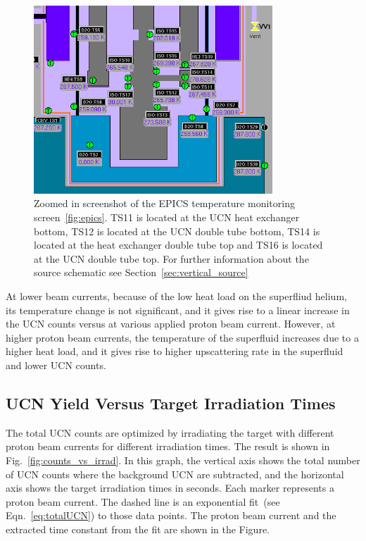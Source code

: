 \begin{figure}[h!]
  \centering
  \includegraphics[width=0.8\textwidth]{TSs.png}
  \caption[TUCAN's EPICS temperature monitoring screen~(zoomed
  in)]{Zoomed in screenshot of the EPICS temperature monitoring
    screen~\ref{fig:epics}. TS11 is located at the UCN heat exchanger
    bottom, TS12 is located at the UCN double tube bottom, TS14 is
    located at the heat exchanger double tube top and TS16 is located
    at the UCN double tube top. For further information about the
    source schematic see Section~\ref{sec:vertical_source}}
  \label{fig:TSs}
\end{figure}

At lower beam currents, because of the low heat load on the superfliud
helium, its temperature change is not significant, and it gives rise
to a linear increase in the UCN counts versus at various applied
proton beam current. However, at higher proton beam currents, the
temperature of the superfluid increases due to a higher heat load, and
it gives rise to higher upscattering rate in the superfluid and lower
UCN counts.


\subsection{UCN Yield Versus Target Irradiation Times}
The total UCN counts are optimized by irradiating the target with
different proton beam currents for different irradiation times. The
result is shown in Fig.~\ref{fig:counts_vs_irrad}. In this graph, the
vertical axis shows the total number of UCN counts where the
background UCN are subtracted, and the horizontal axis shows the
target irradiation times in seconds. Each marker represents a proton
beam current. The dashed line is an exponential fit~(see
Eqn.~\ref{eq:totalUCN}) to those data points. The proton beam current
and the extracted time constant from the fit are shown in the Figure.

